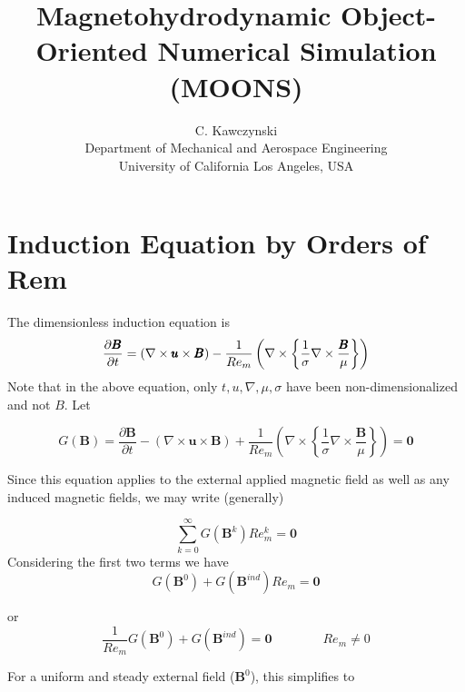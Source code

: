 \documentclass[11pt]{article}
\begin{document}
\doublespacing
\title{Magnetohydrodynamic Object-Oriented Numerical Simulation (MOONS)}
\author{C. Kawczynski \\
Department of Mechanical and Aerospace Engineering \\
University of California Los Angeles, USA\\
}
\maketitle

\section{Induction Equation by Orders of Rem}
The dimensionless induction equation is
\begin{equation}
  \label{eq:ind}
  \frac{\partial \pmb{B}}{\partial t} 
  =
  (\nabla \times \pmb{u} \times \pmb{B})
  - \\
  \frac{1}{Re_m}
  \left(
  \nabla \times
  \left\{
  \frac{1}{\sigma}
  \nabla \times
  \frac{\pmb{B}}{\mu}
  \right\}
  \right)
\end{equation}
Note that in the above equation, only $t,u,\nabla , \mu, \sigma$ have been non-dimensionalized and not $B$. Let

\begin{equation}
  G(\pmb{B})
  =
  \frac{\partial \pmb{B}}{\partial t} 
  -
  (\nabla \times \pmb{u} \times \pmb{B})
  +
  \frac{1}{Re_m}
  \left(
  \nabla \times
  \left\{
  \frac{1}{\sigma}
  \nabla \times
  \frac{\pmb{B}}{\mu}
  \right\}
  \right)
  =
  \pmb{0}
\end{equation}

Since this equation applies to the external applied magnetic field as well as any induced magnetic fields, we may write (generally)

\begin{equation}
	\sum_{k=0}^{\infty} G(\pmb{B}^k)
  Re_m^k
	=
	\pmb{0}
\end{equation}
Considering the first two terms we have
\begin{equation}
  G(\pmb{B}^0)
  +
  G(\pmb{B}^{ind}) Re_m
  =
  \pmb{0}
\end{equation}

or
\begin{equation}
  \frac{1}{Re_m}
  G(\pmb{B}^0)
  +
  G(\pmb{B}^{ind})
  =
  \pmb{0}
  \qquad \qquad
  Re_m \ne 0
\end{equation}

For a uniform and steady external field ($\pmb{B}^0$), this simplifies to
\end{document}
